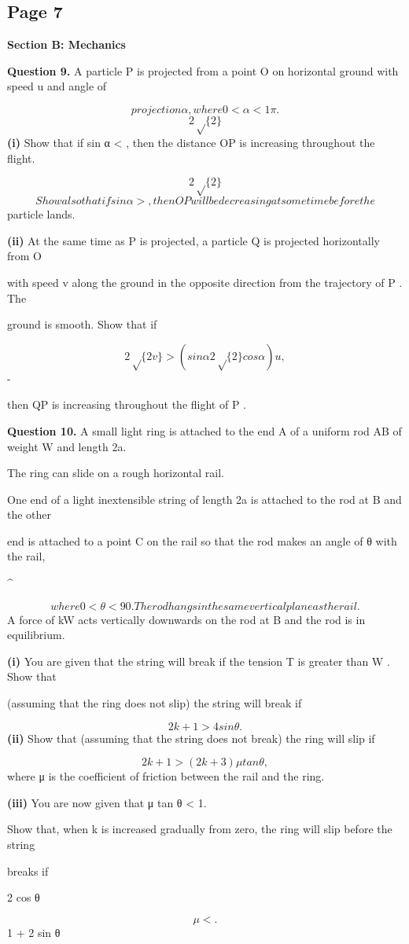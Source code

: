 \documentclass[12pt]{article}
\begin{document}
\subsection*{Page 7}
\begin{flushleft}
\bigskip\textbf{Section B: Mechanics}\par
\bigskip\textbf{Question 9.} A particle P is projected from a point O on horizontal ground with speed u and angle of\par
\[projection α, where 0 < α < 1 \pi.\]
\[2\sqrt\{2\}\]
\textbf{(i)} Show that if sin α < , then the distance OP is increasing throughout the flight.\par
\[2\sqrt\{2\}\]
\[Show also that if sin α > , then OP will be decreasing at some time before the\]
particle lands.\par
\textbf{(ii)} At the same time as P is projected, a particle Q is projected horizontally from O\par
with speed v along the ground in the opposite direction from the trajectory of P . The\par
ground is smooth. Show that if\par
\[2\sqrt\{2v\} > (sin α 2\sqrt\{2\} cos α)u,\]
-\par
then QP is increasing throughout the flight of P .\par
\bigskip\textbf{Question 10.} A small light ring is attached to the end A of a uniform rod AB of weight W and length 2a.\par
The ring can slide on a rough horizontal rail.\par
One end of a light inextensible string of length 2a is attached to the rod at B and the other\par
end is attached to a point C on the rail so that the rod makes an angle of θ with the rail,\par
\textasciicircum{}\circ\par
\[where 0 < θ < 90 . The rod hangs in the same vertical plane as the rail.\]
A force of kW acts vertically downwards on the rod at B and the rod is in equilibrium.\par
\textbf{(i)} You are given that the string will break if the tension T is greater than W . Show that\par
(assuming that the ring does not slip) the string will break if\par
\[2k + 1 > 4 sin θ.\]
\textbf{(ii)} Show that (assuming that the string does not break) the ring will slip if\par
\[2k + 1 > (2k + 3)μ tan θ,\]
where μ is the coefficient of friction between the rail and the ring.\par
\textbf{(iii)} You are now given that μ tan θ < 1.\par
Show that, when k is increased gradually from zero, the ring will slip before the string\par
breaks if\par
2 cos θ\par
\[μ < .\]
1 + 2 sin θ\par
\end{flushleft}
\end{document}
